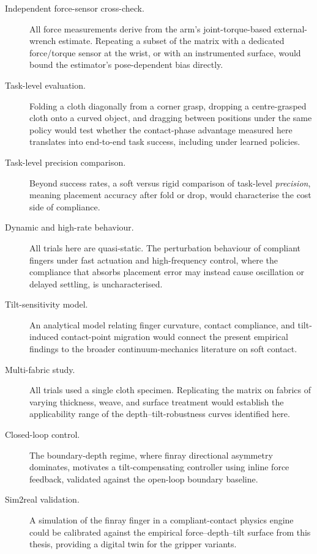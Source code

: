 \begin{description}
  \item[Independent force-sensor cross-check.] All force measurements
        derive from the arm's joint-torque-based external-wrench
        estimate. Repeating a subset of the matrix with a dedicated
        force/torque sensor at the wrist, or with an instrumented
        surface, would bound the estimator's pose-dependent bias
        directly.
  \item[Task-level evaluation.] Folding a cloth diagonally from a
        corner grasp, dropping a centre-grasped cloth onto a curved
        object, and dragging between positions under the same policy
        would test whether the contact-phase advantage measured here
        translates into end-to-end task success, including under learned
        policies.
  \item[Task-level precision comparison.] Beyond success rates, a soft
        versus rigid comparison of task-level \emph{precision}, meaning
        placement accuracy after fold or drop, would characterise the
        cost side of compliance.
  \item[Dynamic and high-rate behaviour.] All trials here are
        quasi-static. The perturbation behaviour of compliant fingers
        under fast actuation and high-frequency control, where the
        compliance that absorbs placement error may instead cause
        oscillation or delayed settling, is uncharacterised.
  \item[Tilt-sensitivity model.] An analytical model relating finger
        curvature, contact compliance, and tilt-induced contact-point
        migration would connect the present empirical findings to the
        broader continuum-mechanics literature on soft contact.
  \item[Multi-fabric study.] All trials used a single cloth specimen.
        Replicating the matrix on fabrics of varying thickness, weave,
        and surface treatment would establish the applicability range
        of the depth--tilt-robustness curves identified here.
  \item[Closed-loop control.] The boundary-depth regime, where finray
        directional asymmetry dominates, motivates a tilt-compensating
        controller using inline force feedback, validated against the
        open-loop boundary baseline.
  \item[Sim2real validation.] A simulation of the finray finger in a
        compliant-contact physics engine could be calibrated against the
        empirical force--depth--tilt surface from this thesis, providing
        a digital twin for the gripper variants.
\end{description}

